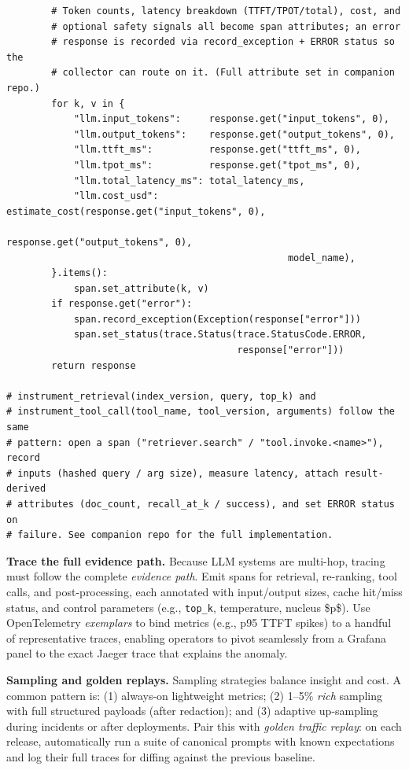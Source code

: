 \begin{codebox}
\begin{verbatim}
        # Token counts, latency breakdown (TTFT/TPOT/total), cost, and
        # optional safety signals all become span attributes; an error
        # response is recorded via record_exception + ERROR status so the
        # collector can route on it. (Full attribute set in companion repo.)
        for k, v in {
            "llm.input_tokens":     response.get("input_tokens", 0),
            "llm.output_tokens":    response.get("output_tokens", 0),
            "llm.ttft_ms":          response.get("ttft_ms", 0),
            "llm.tpot_ms":          response.get("tpot_ms", 0),
            "llm.total_latency_ms": total_latency_ms,
            "llm.cost_usd":         estimate_cost(response.get("input_tokens", 0),
                                                  response.get("output_tokens", 0),
                                                  model_name),
        }.items():
            span.set_attribute(k, v)
        if response.get("error"):
            span.record_exception(Exception(response["error"]))
            span.set_status(trace.Status(trace.StatusCode.ERROR,
                                         response["error"]))
        return response

# instrument_retrieval(index_version, query, top_k) and
# instrument_tool_call(tool_name, tool_version, arguments) follow the same
# pattern: open a span ("retriever.search" / "tool.invoke.<name>"), record
# inputs (hashed query / arg size), measure latency, attach result-derived
# attributes (doc_count, recall_at_k / success), and set ERROR status on
# failure. See companion repo for the full implementation.
\end{verbatim}
\end{codebox}

\medskip
\noindent\textbf{Trace the full evidence path.}
Because LLM systems are multi-hop, tracing must follow the complete \emph{evidence path}. Emit spans for retrieval, re-ranking, tool calls, and post-processing, each annotated with input/output sizes, cache hit/miss status, and control parameters (e.g., \texttt{top\_k}, temperature, nucleus \$p\$). Use OpenTelemetry \emph{exemplars} to bind metrics (e.g., p95 TTFT spikes) to a handful of representative traces, enabling operators to pivot seamlessly from a Grafana panel to the exact Jaeger trace that explains the anomaly.

\medskip
\noindent\textbf{Sampling and golden replays.}
Sampling strategies balance insight and cost. A common pattern is: (1) always-on lightweight metrics; (2) 1--5\% \emph{rich} sampling with full structured payloads (after redaction); and (3) adaptive up-sampling during incidents or after deployments. Pair this with \emph{golden traffic replay}: on each release, automatically run a suite of canonical prompts with known expectations and log their full traces for diffing against the previous baseline.

